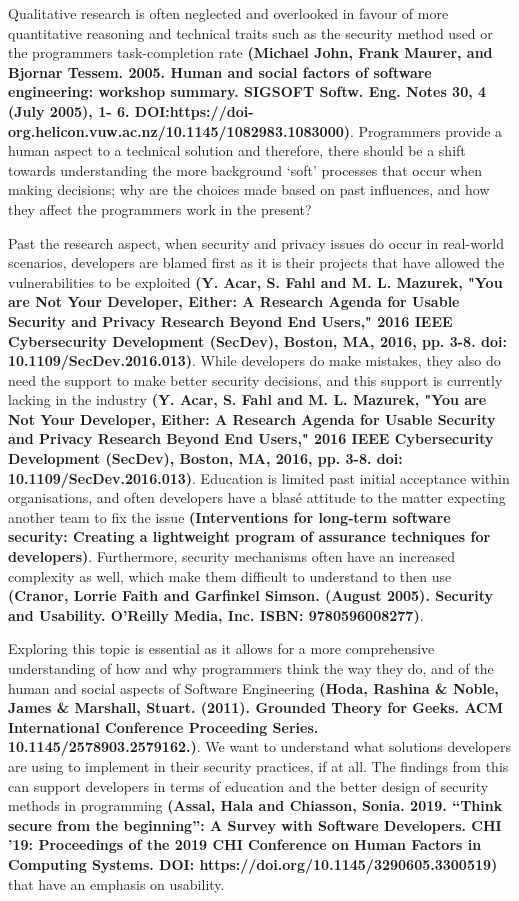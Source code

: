 \par Qualitative research is often neglected and overlooked in favour of more quantitative reasoning and technical traits such as the security method used or the programmers task-completion rate\textbf{ (Michael John, Frank Maurer, and Bjornar Tessem. 2005. Human and social factors of software engineering: workshop summary. SIGSOFT Softw. Eng. Notes 30, 4 (July 2005), 1- 6. DOI:https://doi-org.helicon.vuw.ac.nz/10.1145/1082983.1083000)}. Programmers provide a human aspect to a technical solution and therefore, there should be a shift towards understanding the more background ‘soft’ processes that occur when making decisions; why are the choices made based on past influences, and how they affect the programmers work in the present?
\newline
\par Past the research aspect, when security and privacy issues do occur in real-world scenarios, developers are blamed first as it is their projects that have allowed the vulnerabilities to be exploited \textbf{(Y. Acar, S. Fahl and M. L. Mazurek, "You are Not Your Developer, Either: A Research Agenda for Usable Security and Privacy Research Beyond End Users," 2016 IEEE Cybersecurity Development (SecDev), Boston, MA, 2016, pp. 3-8.
doi: 10.1109/SecDev.2016.013)}. While developers do make mistakes, they also do need the support to make better security decisions, and this support is currently lacking in the industry \textbf{(Y. Acar, S. Fahl and M. L. Mazurek, "You are Not Your Developer, Either: A Research Agenda for Usable Security and Privacy Research Beyond End Users," 2016 IEEE Cybersecurity Development (SecDev), Boston, MA, 2016, pp. 3-8.
doi: 10.1109/SecDev.2016.013)}. Education is limited past initial acceptance within organisations, and often developers have a blasé attitude to the matter expecting another team to fix the issue \textbf{(Interventions for long‐term software security: Creating a lightweight program of assurance techniques for developers)}. Furthermore, security mechanisms often have an increased complexity as well, which make them difficult to understand to then use \textbf{(Cranor, Lorrie Faith and Garfinkel Simson. (August 2005). Security and Usability. O’Reilly Media, Inc. ISBN: 9780596008277)}.
\newline
\par Exploring this topic is essential as it allows for a more comprehensive understanding of how and why programmers think the way they do, and of the human and social aspects of Software Engineering\textbf{ (Hoda, Rashina & Noble, James & Marshall, Stuart. (2011). Grounded Theory for Geeks. ACM International Conference Proceeding Series. 10.1145/2578903.2579162.)}. We want to understand what solutions developers are using to implement in their security practices, if at all. The findings from this can support developers in terms of education and the better design of security methods in programming \textbf{(Assal, Hala and Chiasson, Sonia. 2019. “Think secure from the beginning”: A Survey with Software Developers. CHI '19: Proceedings of the 2019 CHI Conference on Human Factors in Computing Systems. DOI: https://doi.org/10.1145/3290605.3300519) }that have an emphasis on usability.

